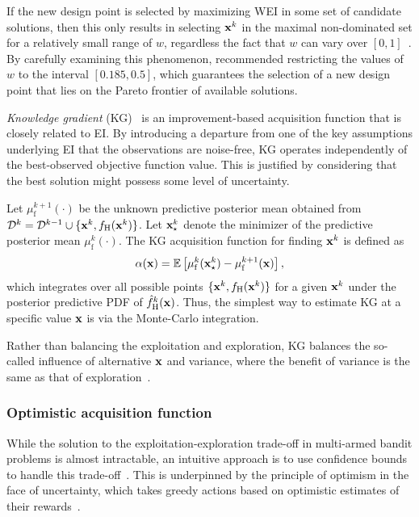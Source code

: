 \documentclass[iicol,sn-basic]{sn-jnl}%
\begin{document}
If the new design point is selected by maximizing WEI in some set of candidate solutions, then this only results in selecting ${\bf x}^k$ in the maximal non-dominated set for a relatively small range of $w$, regardless the fact that $w$ can vary over $[0,1]$~\citep{Ath2021}.
By carefully examining this phenomenon, \cite{Ath2021} recommended restricting the values of $w$ to the interval $[0.185,0.5]$, which guarantees the selection of a new design point that lies on the Pareto frontier of available solutions.

\textit{Knowledge gradient} (KG)~\citep{Frazier2008} is an improvement-based acquisition function that is closely related to EI.
By introducing a departure from one of the key assumptions underlying EI that the observations are noise-free, KG operates independently of the best-observed objective function value.
This is justified by considering that the best solution might possess some level of uncertainty.

Let $\mu_\text{f}^{k+1}({\cdot})$ be the unknown predictive posterior mean obtained from $\mathcal{D}^{k} = \mathcal{D}^{k-1} \cup \{{\bf x}^{k},f_\text{H}({\bf x}^{k})\}$.
Let ${\bf x}_{\star}^k$ denote the minimizer of the predictive posterior mean $\mu_\text{f}^k({\cdot})$.
The KG acquisition function for finding ${\bf x}^k$ is defined as~\citep{Frazier2008}
\begin{equation}\label{Eq44}
	\alpha({\bf x}) = \mathbb{E}\left[\mu_\text{f}^k({\bf x}_{\star}^k)-\mu_\text{f}^{k+1}({\bf x})\right],
\end{equation}
which integrates over all possible points $\{{\bf x}^k,f_\text{H}({\bf x}^k)\}$ for a given ${\bf x}^k$ under the posterior predictive PDF of $\hat{f}_\text{H}^k({\bf x})$.
Thus, the simplest way to estimate KG at a specific value ${\bf x}$ is via the Monte-Carlo integration.

Rather than balancing the exploitation and exploration, KG balances the so-called influence of alternative ${\bf x}$ and variance, where the benefit of variance is the same as that of exploration~\citep{Frazier2008}.

\subsubsection{Optimistic acquisition function}\label{Sec512}

While the solution to the exploitation-exploration trade-off in multi-armed bandit problems is almost intractable, an intuitive approach is to use confidence bounds to handle this trade-off~\citep{Lai1985,Auer2002}.
This is underpinned by the principle of optimism in the face of uncertainty,
which takes greedy actions based on optimistic estimates of their rewards~\citep{Shahriari2016}.
\end{document}
